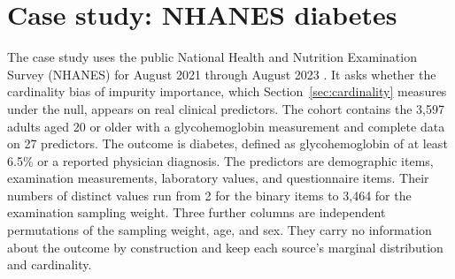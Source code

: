 \documentclass[article]{jss}
\begin{document}
\section{Case study: NHANES diabetes} \label{sec:nhanes}

The case study uses the public National Health and Nutrition Examination
Survey (NHANES) for August 2021 through August 2023 \citep{NCHS:2024}. It asks
whether the cardinality bias of impurity importance, which
Section~\ref{sec:cardinality} measures under the null, appears on real
clinical predictors. The cohort contains the 3,597 adults aged 20 or older
with a glycohemoglobin measurement and complete data on 27 predictors. The
outcome is diabetes, defined as glycohemoglobin of at least 6.5\% or a
reported physician diagnosis. The predictors are demographic items,
examination measurements, laboratory values, and questionnaire items. Their
numbers of distinct values run from 2 for the binary items to 3,464 for the
examination sampling weight. Three further columns are independent
permutations of the sampling weight, age, and sex. They carry no information
about the outcome by construction and keep each source's marginal
distribution and cardinality.
\end{document}
